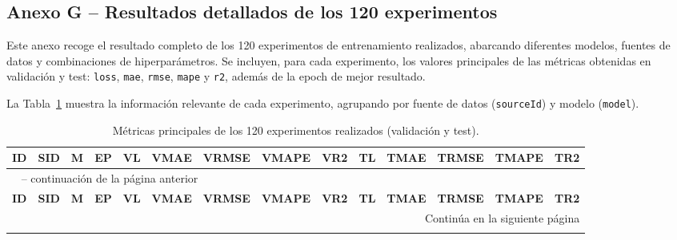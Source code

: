 \begin{landscape}
\section*{Anexo G – Resultados detallados de los 120 experimentos}
\label{anexo:resultados_exp}

Este anexo recoge el resultado completo de los 120 experimentos de entrenamiento realizados, abarcando diferentes modelos, fuentes de datos y combinaciones de hiperparámetros. Se incluyen, para cada experimento, los valores principales de las métricas obtenidas en validación y test: \texttt{loss}, \texttt{mae}, \texttt{rmse}, \texttt{mape} y \texttt{r2}, además de la epoch de mejor resultado. 

La Tabla~\ref{tab:metricas_120_experimentos} muestra la información relevante de cada experimento, agrupando por fuente de datos (\texttt{sourceId}) y modelo (\texttt{model}).

\scriptsize
\setlength{\extrarowheight}{0.5pt}

\begin{longtable}{c | c | c | c | c | c | c | c | c | c | c | c | c | c}
	\caption{Métricas principales de los 120 experimentos realizados (validación y test).}
	\label{tab:metricas_120_experimentos} \\
	\toprule
	\textbf{ID} & \textbf{SID} & \textbf{M} & \textbf{EP} & \textbf{VL} & \textbf{VMAE} & \textbf{VRMSE} & \textbf{VMAPE} & \textbf{VR2} & \textbf{TL} & \textbf{TMAE} & \textbf{TRMSE} & \textbf{TMAPE} & \textbf{TR2} \\
	\midrule
	\endfirsthead
	
	\multicolumn{14}{l}{\tablename\ \thetable{} -- continuación de la página anterior} \\
	\toprule
	\textbf{ID} & \textbf{SID} & \textbf{M} & \textbf{EP} & \textbf{VL} & \textbf{VMAE} & \textbf{VRMSE} & \textbf{VMAPE} & \textbf{VR2} & \textbf{TL} & \textbf{TMAE} & \textbf{TRMSE} & \textbf{TMAPE} & \textbf{TR2} \\
	\midrule
	\endhead
	
	\bottomrule
	\multicolumn{14}{r}{Continúa en la siguiente página} \\
	\endfoot
	

\end{longtable}
\end{landscape}
